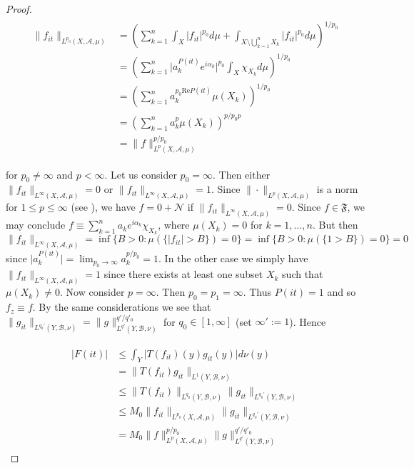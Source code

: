 \begin{proof}
				\begin{gather}
					\begin{aligned}
						\|f_{it}\|_{L^{p_0}(X,\mathcal{A},\mu)} &= \left(\sum_{k = 1}^n \int_X \vert f_{it} \vert^{p_0} d\mu + \int_{X \setminus \bigcup_{k = 1}^n X_k} \vert f_{it} \vert^{p_0} d\mu\right)^{1/p_0}\\
						&= \left(\sum_{k = 1}^n \vert a_k^{P(it)} e^{i\alpha_k}\vert^{p_0}\int_X \chi_{X_k} d\mu\right)^{1/p_0}\\
						&= \left(\sum_{k = 1}^n a_k^{p_0\mathrm{Re}P(it)}\mu(X_k)\right)^{1/p_0}\\
						&= \left(\sum_{k = 1}^n a_{k}^p\mu(X_k)\right)^{p/p_0p}\\
						&= \|f\|_{L^p(X,\mathcal{A},\mu)}^{p/p_0} 
					\end{aligned}
				\end{gather}

				for $p_0 \neq \infty$ and $p < \infty$. Let us consider $p_0 = \infty$. Then either $\|f_{it}\|_{L^{\infty}(X,\mathcal{A},\mu)} = 0$ or $\|f_{it}\|_{L^{\infty}(X,\mathcal{A},\mu)} = 1$. Since $\|\cdot\|_{L^p(X,\mathcal{A},\mu)}$ is a norm for $1 \leqslant p \leqslant \infty$ (see \cite[231]{elstrodt:mass:2011}), we have $f = 0 + \mathcal{N}$ if $\|f_{it}\|_{L^{\infty}(X,\mathcal{A},\mu)} = 0$. Since $f \in \mathfrak{F}$, we may conclude $f \equiv \sum_{k = 1}^n a_k e^{i\alpha_k}\chi_{X_k}$, where $\mu(X_k) = 0$ for $k = 1,\hdots,n$. But then $\|f_{it}\|_{L^{\infty}(X,\mathcal{A},\mu)} = \inf\{B > 0 : \mu(\{\vert f_{it} \vert > B\}) = 0\} =  \inf\{B > 0 : \mu(\{1 > B\}) = 0\}= 0$ since $\vert a_k^{P(it)}\vert = \lim_{p_0 \rightarrow \infty} a_k^{p/p_0} = 1$. In the other case we simply have $\|f_{it}\|_{L^{\infty}(X,\mathcal{A},\mu)} = 1$ since there exists at least one subset $X_k$ such that $\mu(X_k) \neq 0$. Now consider $p = \infty$. Then $p_0 = p_1 = \infty$. Thus $P(it) = 1$ and so $f_z \equiv f$. By the same considerations we see that $\|g_{it}\|_{L^{q_0'}(Y,\mathcal{B},\nu)} = \|g\|_{L^{q'}(Y,\mathcal{B},\nu)}^{q'/q'_0}$ for $q_0 \in [1,\infty]$ (set $\infty' := 1 $). Hence

				\begin{gather}
					\begin{aligned}
						\vert F(it) \vert &\leqslant \int_Y \vert T(f_{it})(y)g_{it}(y)\vert d\nu(y)\\
						&= \|T(f_{it}) g_{it}\|_{L^1(Y,\mathcal{B},\nu)}\\
						&\leqslant \|T(f_{it})\|_{L^{q_0}(Y,\mathcal{B},\nu)}\|g_{it}\|_{L^{q_0'}(Y,\mathcal{B},\nu)}\\
						&\leqslant M_0 \|f_{it}\|_{L^{p_0}(X,\mathcal{A},\mu)} \|g_{it}\|_{L^{q_0'}(Y,\mathcal{B},\nu)}\\
						&= M_0  \|f\|_{L^p(X,\mathcal{A},\mu)}^{p/p_0} \|g\|_{L^{q'}(Y,\mathcal{B},\nu)}^{q'/q'_0}
					\end{aligned}
				\end{gather}


\end{proof}
